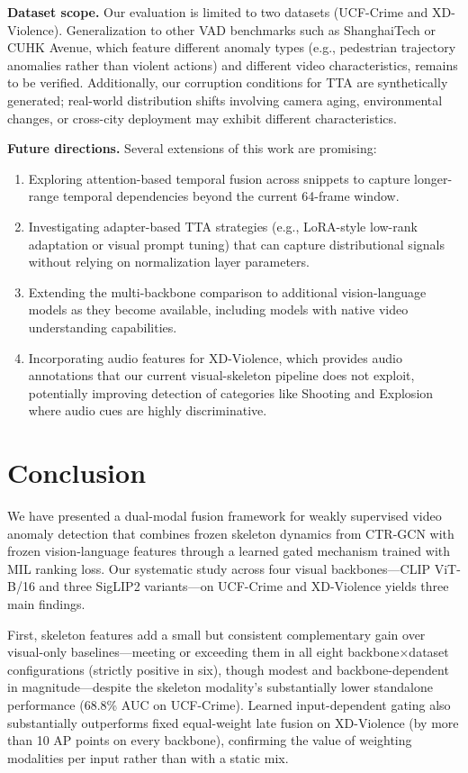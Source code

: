 \documentclass[sigconf]{acmart}
\begin{document}
\textbf{Dataset scope.} Our evaluation is limited to two datasets (UCF-Crime and XD-Violence). Generalization to other VAD benchmarks such as ShanghaiTech or CUHK Avenue, which feature different anomaly types (e.g., pedestrian trajectory anomalies rather than violent actions) and different video characteristics, remains to be verified. Additionally, our corruption conditions for TTA are synthetically generated; real-world distribution shifts involving camera aging, environmental changes, or cross-city deployment may exhibit different characteristics.

\textbf{Future directions.} Several extensions of this work are promising:
\begin{enumerate}
    \item Exploring attention-based temporal fusion across snippets to capture longer-range temporal dependencies beyond the current 64-frame window.
    \item Investigating adapter-based TTA strategies (e.g., LoRA-style low-rank adaptation or visual prompt tuning) that can capture distributional signals without relying on normalization layer parameters.
    \item Extending the multi-backbone comparison to additional vision-language models as they become available, including models with native video understanding capabilities.
    \item Incorporating audio features for XD-Violence, which provides audio annotations that our current visual-skeleton pipeline does not exploit, potentially improving detection of categories like Shooting and Explosion where audio cues are highly discriminative.
\end{enumerate}

\section{Conclusion}

We have presented a dual-modal fusion framework for weakly supervised video anomaly detection that combines frozen skeleton dynamics from CTR-GCN with frozen vision-language features through a learned gated mechanism trained with MIL ranking loss. Our systematic study across four visual backbones---CLIP ViT-B/16 and three SigLIP2 variants---on UCF-Crime and XD-Violence yields three main findings.

First, skeleton features add a small but consistent complementary gain over visual-only baselines---meeting or exceeding them in all eight backbone$\times$dataset configurations (strictly positive in six), though modest and backbone-dependent in magnitude---despite the skeleton modality's substantially lower standalone performance (68.8\% AUC on UCF-Crime). Learned input-dependent gating also substantially outperforms fixed equal-weight late fusion on XD-Violence (by more than 10 AP points on every backbone), confirming the value of weighting modalities per input rather than with a static mix.
\end{document}
